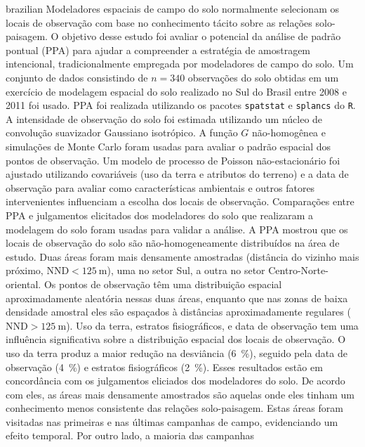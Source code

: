 \begin{chapterabstract}{brazilian}{\ptkeys}
Modeladores espaciais de campo do solo normalmente selecionam os locais de observação com base no 
conhecimento tácito sobre as relações solo-paisagem. O objetivo desse estudo foi avaliar o potencial da 
análise de padrão pontual (PPA) para ajudar a compreender a estratégia de amostragem intencional, 
tradicionalmente empregada por modeladores de campo do solo. Um conjunto de dados consistindo de $n = 340$ 
observações do solo obtidas em um exercício de modelagem espacial do solo realizado no Sul do Brasil entre 
\num{2008} e \num{2011} foi usado. PPA foi realizada utilizando os pacotes \texttt{spatstat} e 
\texttt{splancs} do \texttt{R}. A intensidade de observação do solo foi estimada utilizando um núcleo de 
convolução suavizador Gaussiano isotrópico. A função $G$ não-homogênea e simulações de Monte Carlo foram 
usadas para avaliar o padrão espacial dos pontos de observação. Um modelo de processo de Poisson 
não-estacionário foi ajustado utilizando covariáveis (uso da terra e atributos do terreno) e a data de 
observação para avaliar como características ambientais e outros fatores intervenientes influenciam a escolha 
dos locais de observação. Comparações entre PPA e julgamentos elicitados dos modeladores do solo que 
realizaram a modelagem do solo foram usadas para validar a análise. A PPA mostrou que os locais de observação 
do solo são não-homogeneamente distribuídos na área de estudo. Duas áreas foram mais densamente amostradas 
(distância do vizinho mais próximo, $\text{NND} < \SI{125}{\m}$), uma no setor Sul, a outra no setor 
Centro-Norte-oriental. Os pontos de observação têm uma distribuição espacial aproximadamente aleatória nessas 
duas áreas, enquanto que nas zonas de baixa densidade amostral eles são espaçados à distâncias aproximadamente 
regulares ($\text{NND} > \SI{125}{\m}$). Uso da terra, estratos fisiográficos, e data de observação tem uma 
influência significativa sobre a distribuição espacial dos locais de observação. O uso da terra produz a maior 
redução na desviância (\SI{6}{\percent}), seguido pela data de observação (\SI{4}{\percent}) e estratos 
fisiográficos (\SI{2}{\percent}). Esses resultados estão em concordância com os julgamentos eliciados dos 
modeladores do solo. De acordo com eles, as áreas mais densamente amostrados são aquelas onde eles tinham um 
conhecimento menos consistente das relações solo-paisagem. Estas áreas foram visitadas nas primeiras e nas 
últimas campanhas de campo, evidenciando um efeito temporal. Por outro lado, a maioria das campanhas 

\end{chapterabstract}
